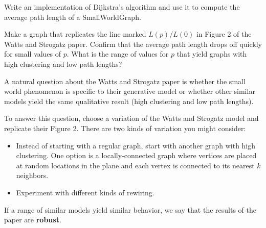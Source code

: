 \documentclass[10pt]{book}
\begin{document}
\begin{ex}

Write an implementation of Dijkstra's algorithm and use it
to compute the average path length of a SmallWorldGraph.

Make a graph that replicates the line marked $L(p)/L(0)$ in
Figure 2 of the Watts and Strogatz paper.  Confirm that the 
average path length drops off quickly for
small values of $p$.  What is the range of values for $p$
that yield graphs with high clustering and low path lengths?

\end{ex}


\begin{ex}

A natural question about the Watts and Strogatz paper is
whether the small world phenomenon is specific to their
generative model or whether other similar models yield
the same qualitative result (high clustering and low path lengths).

To answer this question, choose a variation of the
Watts and Strogatz model and replicate their Figure 2.
There are two kinds of variation you might consider:

\begin{itemize}

\item Instead of starting with a regular graph, start with
another graph with high clustering.  One option is a locally-connected
graph where vertices are placed at random locations in the plane
and each vertex is connected to its nearest $k$ neighbors.

\item Experiment with different kinds of rewiring.

\end{itemize}

If a range of similar models yield similar behavior, we
say that the results of the paper are {\bf robust}.

\end{ex}
\end{document}

